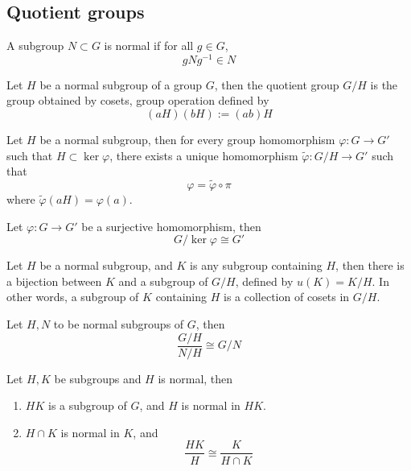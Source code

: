 \subsection{Quotient groups}
\begin{defn}
    A subgroup $N\subset G$ is normal if for all $g\in G$, 
    \begin{equation*}
        gNg^{-1}\in N
    \end{equation*}
\end{defn}
\begin{defn}
    Let $H$ be a normal subgroup of a group $G$, then the quotient group $G/H$ is the group obtained by cosets, group operation defined by 
    \begin{equation*}
        (aH)(bH):=(ab)H
    \end{equation*}
\end{defn}
\begin{thm}
    Let $H$ be a normal subgroup, then for every group homomorphism $\varphi:G\to G'$ such that $H\subset\ker\varphi$, there exists a unique homomorphism $\tilde{\varphi}:G/H\to G'$ such that
    \begin{equation*}
        \varphi=\tilde{\varphi}\circ\pi
    \end{equation*}
    where $\tilde{\varphi}(aH)=\varphi(a)$.
\end{thm}
\begin{cor}
    Let $\varphi:G\to G'$ be a surjective homomorphism, then
    \begin{equation*}
        G/\ker\varphi\cong G'
    \end{equation*}
\end{cor}

\begin{prop}
    Let $H$ be a normal subgroup, and $K$ is any subgroup containing $H$, then there is a bijection between $K$ and a subgroup of $G/H$, defined by $u(K)=K/H$. In other words, a subgroup of $K$ containing $H$ is a collection of cosets in $G/H$.
\end{prop}
\begin{thm}
    Let $H,N$ to be normal subgroups of $G$, then 
    \begin{equation*}
        \frac{G/H}{N/H}\cong G/N
    \end{equation*}
\end{thm}
\begin{thm}
    Let $H,K$ be subgroups and $H$ is normal, then
    \begin{enumerate}
        \item $HK$ is a subgroup of $G$, and $H$ is normal in $HK$.
        \item $H\cap K$ is normal in $K$, and 
        \begin{equation*}
            \frac{HK}{H}\cong\frac{K}{H\cap K}
        \end{equation*}
    \end{enumerate}
\end{thm}
